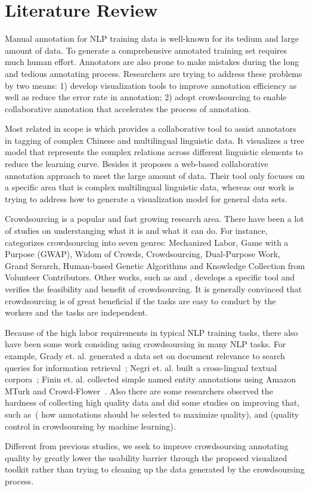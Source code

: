 \section{Literature Review}

Manual annotation for NLP training data is well-known for its tedium
and large amount of data. To generate a comprehensive annotated
training set requires much human effort. Annotators are also prone to
make mistakes during the long and tedious annotating process.
Researchers are trying to address these problems by two means: 1)
develop visualization tools to improve annotation efficiency as well
as reduce the error rate in annotation; 2) adopt crowdsourcing to
enable collaborative annotation that accelerates the process of
annotation.

Most related in scope is \cite{yan2012collaborative} which provides a
collaborative tool to assist annotators in tagging of complex Chinese
and multilingual linguistic data. It visualizes a tree model that
represents the complex relations across different linguistic elements
to reduce the learning curve. Besides it proposes a web-based
collaborative annotation approach to meet the large amount of data.
Their tool only focuses on a specific area that is complex
multilingual linguistic data, whereas our work is trying to address
how to generate a visualization model for general data sets.

Crowdsourcing \cite{howe2006rise} is a popular and fast growing
research area. There have been a lot of studies on understanging what
it is and what it can do. For instance, \cite{quinn2009taxonomy}
categorizes crowdsourcing into seven genres: Mechanized Labor, Game
with a Purpose (GWAP), Widom of Crowds, Crowdsourcing, Dual-Purpose
Work, Grand Serarch, Human-based Genetic Algorithms and Knowledge
Collection from Volunteer Contributors. Other works, such as
\cite{abekawa2010community} and \cite{irvine2010using}, develops a
specific tool and verifies the feasibility and benefit of
crowdsourcing. It is generally convinced that crowdsourcing is of
great beneficial if the tasks are easy to conduct by the workers and
the tasks are independent.

Because of the high labor requirements in typical NLP training tasks,
there also have been some work considing using crowdsoursing in many
NLP tasks. For example, Grady et. al. generated a data set on document
relevance to search queries for information
retrieval~\cite{Grady2010CDR18666961866723}; Negri et. al. built a
cross-lingual textual corpora~\cite{Negri2011DCC21454322145510};
Finin et. al. collected simple named entity annotations using Amazon MTurk
and Crowd-Flower~\cite{Finin2010ANE18666961866709}. Also there are
some researchers observed the hardness of collecting high quality data
and did some studies on improving that, such
as~\cite{Hsueh2009DQC15641311564137}( how annotations should be
selected to maximize quality), and \cite{lease2011quality} (quality
control in crowdsoursing by machine learning).

Different from previous studies, we seek to improve crowdsoursing
annotating quality by greatly lower the usability barrier through the
proposed visualized toolkit rather than trying to cleaning up the data
generated by the crowdsoursing process. 
